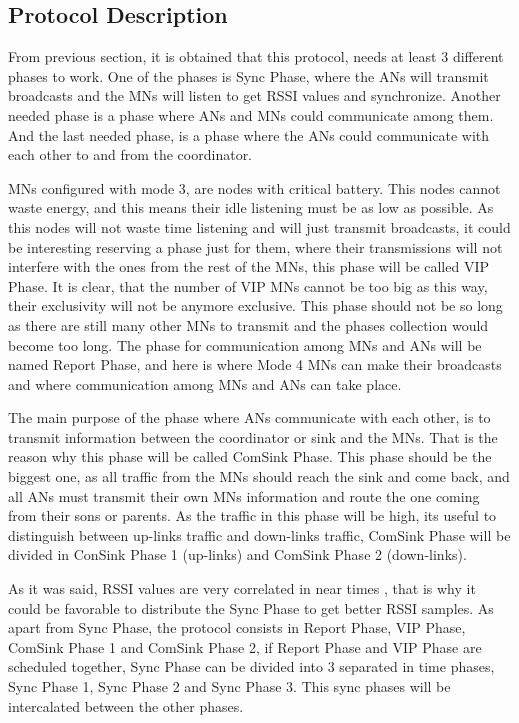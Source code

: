 \subsection{Protocol Description}

From previous section, it is obtained that this protocol, needs at least 3 different phases to work. One of the phases is Sync 
Phase, where the \acp{AN} will transmit broadcasts and the \acp{MN} will listen to get \ac{RSSI} values and synchronize. Another needed 
phase is a phase where \acp{AN} and \acp{MN} could communicate among them. And the last needed phase, is a phase where the \acp{AN} could 
communicate with each other to and from the coordinator.

\acp{MN} configured with mode 3, are nodes with critical battery. This nodes cannot waste energy, and this means their idle listening must be
as low as possible. As this nodes will not waste time listening and will just transmit broadcasts, it could be interesting reserving a phase
just for them, where their transmissions will not interfere with the ones from the rest of the \acp{MN}, this phase will be called \ac{VIP} 
Phase. It is clear, that the number of \ac{VIP} \acp{MN} cannot be too big as this way, their exclusivity will not be anymore exclusive.
This phase should not be so long as there are still many other \acp{MN} to transmit and the phases collection would become too long.
The phase for communication among \acp{MN} and \acp{AN} will be named Report Phase, and here is where Mode 4 \acp{MN} can make 
their broadcasts and where communication among \acp{MN} and \acp{AN} can take place.

The main purpose of the phase where \acp{AN} communicate with each other, is to transmit information between the coordinator or sink and 
the \acp{MN}. That is the reason why this phase will be called ComSink Phase. This phase should be the biggest one, as all traffic from 
the \acp{MN} should reach the sink and come back, and all \acp{AN} must transmit their own \acp{MN} information and route the one coming from
their sons or parents. As the traffic in this phase will be high, its useful to distinguish between up-links traffic and down-links traffic, 
ComSink Phase will be divided in ConSink Phase 1 (up-links) and ComSink Phase 2 (down-links).

As it was said, \ac{RSSI} values are very correlated in near times \cite{RSSIcorrelated}, that is why it could be favorable to distribute the 
Sync Phase to get better \ac{RSSI} samples. As apart from Sync Phase, the protocol consists in Report Phase, \ac{VIP}
Phase, ComSink Phase 1 and ComSink Phase 2, if Report Phase and \ac{VIP} Phase are scheduled together, Sync Phase can be divided into 3
separated in time phases, Sync Phase 1, Sync Phase 2 and Sync Phase 3. This sync phases will be intercalated between the other phases.

